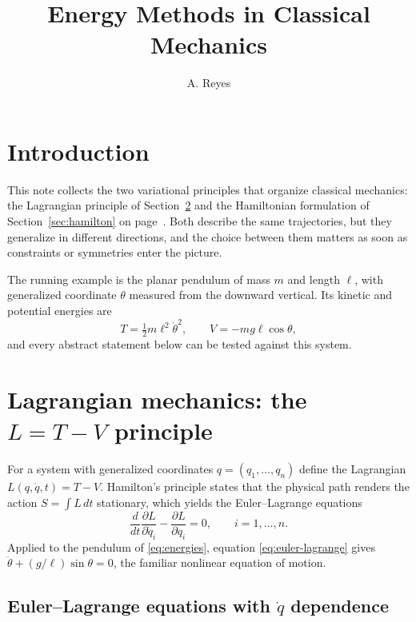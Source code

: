 \documentclass[11pt]{article}
\title{Energy Methods in Classical Mechanics}
\author{A. Reyes}
\date{}
\begin{document}
\maketitle
\tableofcontents

\section{Introduction}
\label{sec:intro}

This note collects the two variational principles that organize classical
mechanics: the Lagrangian principle of Section~\ref{sec:lagrange} and the
Hamiltonian formulation of Section~\ref{sec:hamilton} on
page~\pageref{sec:hamilton}. Both describe the same trajectories, but they
generalize in different directions, and the choice between them matters as
soon as constraints or symmetries enter the picture.

The running example is the planar pendulum of mass $m$ and length $\ell$,
with generalized coordinate $\theta$ measured from the downward vertical.
Its kinetic and potential energies are
\begin{equation}
  \label{eq:energies}
  T = \tfrac12 m \ell^{2} \dot{\theta}^{2}, \qquad
  V = -m g \ell \cos\theta,
\end{equation}
and every abstract statement below can be tested against this system.

\section{Lagrangian mechanics: the \texorpdfstring{$L = T - V$}{L = T - V} principle}
\label{sec:lagrange}

For a system with generalized coordinates $q = (q_1, \dots, q_n)$ define the
Lagrangian $L(q, \dot{q}, t) = T - V$. Hamilton's principle states that the
physical path renders the action $S = \int L \, dt$ stationary, which yields
the Euler--Lagrange equations
\begin{equation}
  \label{eq:euler-lagrange}
  \frac{d}{dt}\frac{\partial L}{\partial \dot{q}_i}
    - \frac{\partial L}{\partial q_i} = 0,
    \qquad i = 1, \dots, n.
\end{equation}
Applied to the pendulum of \eqref{eq:energies}, equation
\eqref{eq:euler-lagrange} gives $\ddot{\theta} + (g/\ell)\sin\theta = 0$,
the familiar nonlinear equation of motion.

\subsection{Euler--Lagrange equations with \texorpdfstring{$\dot{q}$}{q-dot} dependence}
\label{sec:qdot}
\end{document}
